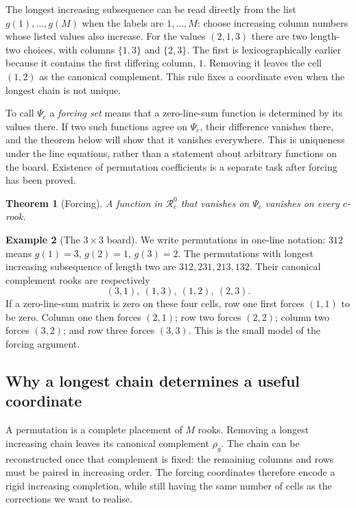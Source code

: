 \documentclass[11pt,a4paper,oneside,openany]{book}
\newtheorem{theorem}{Theorem}[chapter]
\theoremstyle{definition}\newtheorem{definition}[theorem]{Definition}
\newtheorem{example}[theorem]{Example}
\theoremstyle{remark}\newtheorem{remark}[theorem]{Remark}
\numberwithin{equation}{chapter}
\begin{document}
The longest increasing subsequence can be read directly from the
list $g(1),\ldots,g(M)$ when the labels are $1,\ldots,M$: choose
increasing column numbers whose listed values also increase.
For the values $(2,1,3)$ there are two length-two choices,
with columns $\{1,3\}$ and $\{2,3\}$. The first is lexicographically
earlier because it contains the first differing column, $1$.
Removing it leaves the cell $(1,2)$ as the canonical complement.
This rule fixes a coordinate even when the longest chain is not unique.

To call $\Psi_c$ a \emph{forcing set} means that a zero-line-sum
function is determined by its values there. If two such functions
agree on $\Psi_c$, their difference vanishes there, and the theorem
below will show that it vanishes everywhere. This is uniqueness under
the line equations, rather than a statement about arbitrary functions
on the board. Existence of permutation coefficients is a separate
task after forcing has been proved.

\begin{theorem}[Forcing]\label{tx:thm:force}
A function in $\mathcal R_c^{0}$ that vanishes on $\Psi_c$ vanishes on every $c$-rook.
\end{theorem}


\begin{example}[The $3\times3$ board]
We write permutations in one-line notation: $312$ means
$g(1)=3$, $g(2)=1$, $g(3)=2$.
The permutations with longest increasing subsequence of length two are $312,231,213,132$. Their canonical complement rooks are respectively
\[(3,1),\ (1,3),\ (1,2),\ (2,3).
\]
If a zero-line-sum matrix is zero on these four cells, row one first forces $(1,1)$ to be zero. Column one then forces $(2,1)$; row two forces $(2,2)$; column two forces $(3,2)$; and row three forces $(3,3)$. This is the small model of the forcing argument.
\end{example}

\subsection{Why a longest chain determines a useful coordinate}
A permutation is a complete placement of $M$ rooks. Removing a longest
increasing chain leaves its canonical complement $\rho_g$. The chain
can be reconstructed once that complement is fixed: the remaining
columns and rows must be paired in increasing order. The forcing
coordinates therefore encode a rigid increasing completion, while
still having the same number of cells as the corrections we want to
realise.
\end{document}
